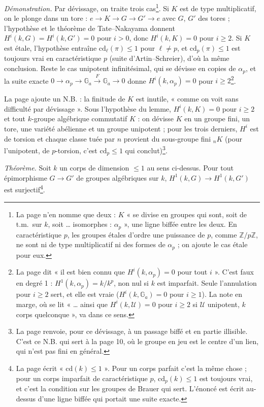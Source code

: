 \documentclass[11pt,a4paper]{article}
\begin{document}
\emph{Démonstration.} Par dévissage, on traite trois cas\footnote{La page n'en
nomme que deux : $K$ « se divise en groupes qui sont, soit de t.m.\ sur $k$,
soit … isomorphes : $\alpha_p$ », une ligne biffée entre les deux. En
caractéristique $p$, les groupes étales d'ordre une puissance de $p$, comme
$\mathbb{Z}/p\mathbb{Z}$, ne sont ni de type multiplicatif ni des formes de
$\alpha_p$ ; on ajoute le cas étale pour eux.}. Si $K$ est de type
multiplicatif, on le plonge dans un tore : $e \to K \to G \to G' \to e$ avec $G$,
$G'$ des tores ; l'hypothèse et le théorème de Tate--Nakayama donnent
$H^i(k,G) = H^i(k,G') = 0$ pour $i > 0$, donc $H^i(k,K) = 0$ pour $i \geq 2$. Si $K$
est étale, l'hypothèse entraîne $\mathrm{cd}_\ell(\pi) \leq 1$ pour $\ell \neq p$,
et $\mathrm{cd}_p(\pi) \leq 1$ est toujours vrai en caractéristique $p$ (suite
d'Artin--Schreier), d'où la même conclusion. Reste le cas unipotent infinitésimal, qui se dévisse en copies de
$\alpha_p$, et la suite exacte $0 \to \alpha_p \to \mathbb{G}_a
\xrightarrow{F} \mathbb{G}_a \to 0$ donne $H^i(k,\alpha_p) = 0$ pour
$i \geq 2$\footnote{La page dit « il est bien connu que $H^i(k,\alpha_p) = 0$
pour tout $i$ ». C'est faux en degré 1 : $H^1(k,\alpha_p) = k/k^p$, non nul si
$k$ est imparfait. Seule l'annulation pour $i \geq 2$ sert, et elle est vraie
($H^i(k,\mathbb{G}_a) = 0$ pour $i \geq 1$). La note en marge, où se lit
« … ainsi que $H^i(k,\mathcal{U}) = 0$ pour $i \geq 2$ si $\mathcal{U}$ unipotent,
$k$ corps quelconque », va dans ce sens.}.

La page ajoute un N.B. : la finitude de $K$ est inutile, « comme on voit sans
difficulté par dévissage ». Sous l'hypothèse du lemme, $H^i(k,K) = 0$ pour
$i \geq 2$ et tout $k$-groupe algébrique commutatif $K$ : on dévisse $K$ en un
groupe fini, un tore, une variété abélienne et un groupe unipotent ; pour les
trois derniers, $H^i$ est de torsion et chaque classe tuée par $n$ provient du
sous-groupe fini ${}_nK$ (pour l'unipotent, de $p$-torsion, c'est
$\mathrm{cd}_p \leq 1$ qui conclut)\footnote{La page renvoie, pour ce dévissage,
à un passage biffé et en partie illisible. C'est ce N.B. qui sert à la page 10,
où le groupe en jeu est le centre d'un lien, qui n'est pas fini en général.}.

\emph{Théorème.} Soit $k$ un corps de dimension $\leq 1$ au sens ci-dessus.
Pour tout épimorphisme $G \to G'$ de groupes algébriques sur $k$,
$H^1(k,G) \to H^1(k,G')$ est surjectif\footnote{La page écrit
« $\mathrm{cd}(k) \leq 1$ ». Pour un corps parfait c'est la même chose ; pour un
corps imparfait de caractéristique $p$, $\mathrm{cd}_p(k) \leq 1$ est toujours
vrai, et c'est la condition sur les groupes de Brauer qui sert. L'énoncé est
écrit au-dessus d'une ligne biffée qui portait une suite exacte.}.
\end{document}
